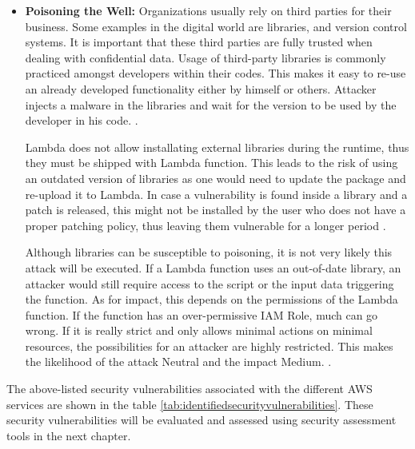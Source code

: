 \begin{itemize}
    \item \textbf{Poisoning the Well:} Organizations usually rely on third parties for their business.
    Some examples
    in the
    digital world are libraries, and version control systems.
    It is important that
    these third parties are fully trusted when dealing with confidential data.
    Usage of third-party libraries is
    commonly practiced amongst developers within their codes.
    This makes it easy to re-use an already developed
    functionality either by himself or others.
    Attacker injects a malware in the libraries and wait for the version to be used by the developer in his code.
    \cite{71}.

    Lambda does not allow installating external libraries during the runtime, thus they must be shipped with Lambda function.
    This leads to the risk of using an outdated version of libraries as one would need to update the package and re-upload it to Lambda.
    In case a vulnerability is found inside a library and a patch is released, this might not be installed by the
    user who does not have a proper patching policy, thus
    leaving them vulnerable for a longer period \cite{72}.

    Although libraries can be susceptible to poisoning, it is not very likely this attack will be executed.
    If a Lambda function uses an out-of-date library, an attacker would still require access to the script or the input data triggering the function.
    As for impact, this depends on the permissions of the Lambda function.
    If the function has an over-permissive IAM Role, much can go wrong.
    If it is really strict and only allows minimal actions on minimal resources, the possibilities for an attacker are highly restricted.
    This makes the likelihood of the attack Neutral and the impact Medium. \cite{64}.
\end{itemize}

\par The above-listed security vulnerabilities associated
with the different AWS services are shown in the table
\ref{tab:identifiedsecurityvulnerabilities}.
These
security vulnerabilities will be evaluated and assessed
using security
assessment tools in the next chapter.

